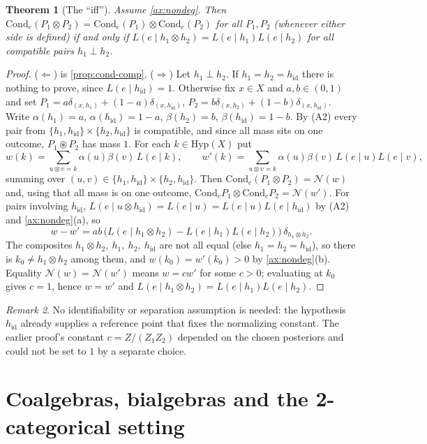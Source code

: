 \documentclass[11pt]{article}
\newtheorem{theorem}{Theorem}[section]
\theoremstyle{definition}
\theoremstyle{remark}
\newtheorem{remark}[theorem]{Remark}
\newcommand{\Hyp}{\mathrm{Hyp}}
\newcommand{\Cond}{\mathrm{Cond}}
\newcommand{\hid}{h_{\mathrm{id}}}
\newcommand{\N}{\mathcal{N}}
\newcommand{\cp}{\circledast}
\begin{document}
\begin{theorem}[The ``iff'']\label{thm:iff}
Assume \cref{ax:nondeg}. Then $\Cond_e(P_1\otimes P_2)=\Cond_e(P_1)\otimes\Cond_e(P_2)$ for all
$P_1,P_2$ (whenever either side is defined) if and only if
$L(e\mid h_1\otimes h_2)=L(e\mid h_1)L(e\mid h_2)$ for all compatible pairs $h_1\perp h_2$.
\end{theorem}
\begin{proof}
($\Leftarrow$) is \cref{prop:cond-comp}. ($\Rightarrow$) Let $h_1\perp h_2$. If $h_1=h_2=\hid$ there
is nothing to prove, since $L(e\mid\hid)=1$. Otherwise fix $x\in X$ and $a,b\in(0,1)$ and set
$P_1=a\delta_{(x,h_1)}+(1-a)\delta_{(x,\hid)}$, $P_2=b\delta_{(x,h_2)}+(1-b)\delta_{(x,\hid)}$. Write
$\alpha(h_1)=a$, $\alpha(\hid)=1-a$, $\beta(h_2)=b$, $\beta(\hid)=1-b$. By (A2) every pair from
$\{h_1,\hid\}\times\{h_2,\hid\}$ is compatible, and since all mass sits on one outcome, $P_1\cp P_2$
has mass $1$. For each $k\in\Hyp(X)$ put
\[
w(k)=\sum_{u\otimes v=k}\alpha(u)\beta(v)\,L(e\mid k),\qquad
w'(k)=\sum_{u\otimes v=k}\alpha(u)\beta(v)\,L(e\mid u)L(e\mid v),
\]
summing over $(u,v)\in\{h_1,\hid\}\times\{h_2,\hid\}$. Then $\Cond_e(P_1\otimes P_2)=\N(w)$ and, using
that all mass is on one outcome, $\Cond_eP_1\otimes\Cond_eP_2=\N(w')$. For pairs involving $\hid$,
$L(e\mid u\otimes\hid)=L(e\mid u)=L(e\mid u)L(e\mid\hid)$ by (A2) and \cref{ax:nondeg}(a), so
\[
w-w'=ab\,\big(L(e\mid h_1\otimes h_2)-L(e\mid h_1)L(e\mid h_2)\big)\,\delta_{h_1\otimes h_2}.
\]
The composites $h_1\otimes h_2,\ h_1,\ h_2,\ \hid$ are not all equal (else $h_1=h_2=\hid$), so there is
$k_0\neq h_1\otimes h_2$ among them, and $w(k_0)=w'(k_0)>0$ by \cref{ax:nondeg}(b). Equality
$\N(w)=\N(w')$ means $w=cw'$ for some $c>0$; evaluating at $k_0$ gives $c=1$, hence $w=w'$ and
$L(e\mid h_1\otimes h_2)=L(e\mid h_1)L(e\mid h_2)$.
\end{proof}

\begin{remark}
No identifiability or separation assumption is needed: the hypothesis $\hid$ already supplies a
reference point that fixes the normalizing constant. The earlier proof's constant
$c=Z/(Z_1Z_2)$ depended on the chosen posteriors and could not be set to $1$ by a separate choice.
\end{remark}

\section{Coalgebras, bialgebras and the 2-categorical setting}\label{sec:coalg}
\end{document}
